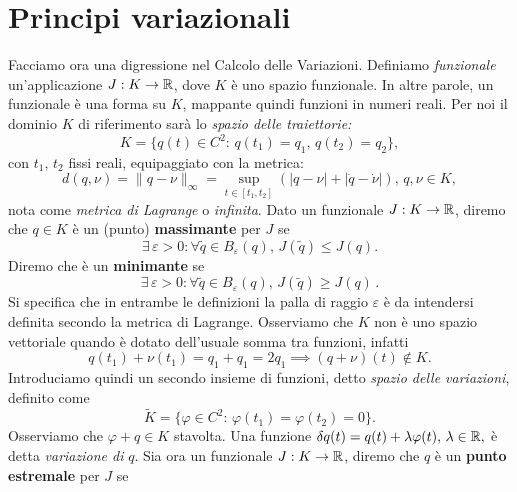     \section{Principi variazionali}
    Facciamo ora una digressione nel Calcolo delle Variazioni. Definiamo \emph{funzionale} un'applicazione $J:K\to \mathbb{R}$, dove $K$ è uno spazio funzionale. In altre parole, un funzionale è una forma su $K$, mappante quindi funzioni in numeri reali. Per noi il dominio $K$ di riferimento sarà lo \emph{spazio delle traiettorie:}
    \begin{equation}
        K = \{q(t) \in C^2:\,q(t_1)=q_1,\,q(t_2)=q_2\},
    \end{equation}
    con $t_1,\,t_2$ fissi reali, equipaggiato con la metrica:
    \begin{equation}
        d(q,\nu) = \|q-\nu\|_\infty = \sup_{t \in[t_1,t_2]}(|q-\nu|+|\dot{q}-\dot{\nu}|),\, q,\nu \in K,
    \end{equation}
    nota come \emph{metrica di Lagrange} o \textit{infinita}.
    Dato un funzionale $J:K\to \mathbb{R}$, diremo che $q \in K$ è un (punto) \textbf{massimante} per $J$ se 
    \begin{equation}
    \exists\, \varepsilon>0: \forall \tilde{q} \in B_\varepsilon(q),\, J(\tilde{q}) \leq J(q).
    \end{equation}
    Diremo che è un \textbf{minimante} se 
    \begin{equation}
    \exists\, \varepsilon>0: \forall \tilde{q} \in B_\varepsilon(q),\, J(\tilde{q}) \geq J(q)\,.
    \end{equation}
    Si specifica che in entrambe le definizioni la palla di raggio $\varepsilon$ è da intendersi definita secondo la metrica di Lagrange.
    Osserviamo che $K$ non è uno spazio vettoriale quando è dotato dell'usuale somma tra funzioni, infatti
    \begin{equation}
        q(t_1)+\nu(t_1) = q_1+q_1 = 2q_1 \implies (q+\nu)(t) \notin K.
    \end{equation}
    Introduciamo quindi un secondo insieme di funzioni, detto \emph{spazio delle variazioni}, definito come
    \begin{equation}
        \tilde{K} = \{\varphi \in C^2:\, \varphi(t_1)=\varphi(t_2) = 0\}.
    \end{equation}
    Osserviamo che $\varphi+q \in K$ stavolta. Una funzione $\delta q(t) = q(t) + \lambda \varphi(t),\, \lambda \in \mathbb{R},$ è detta \emph{variazione di} $q$.
    Sia ora un funzionale $J:K\to \mathbb{R}$, diremo che $q$ è un \textbf{punto estremale} per $J$ se 
